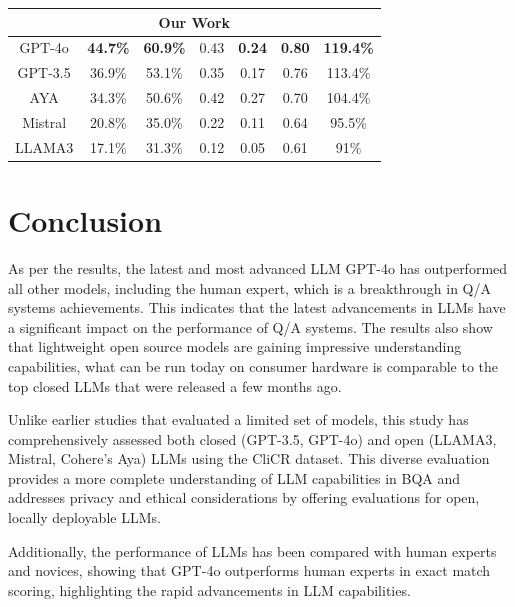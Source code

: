 \documentclass[onecolumn, conference]{IEEEtran}
\begin{document}
\begin{table}
\begin{tabular}{|c|c|c|c|c|c|c|}
    \multicolumn{7}{|c|}{Our Work}                                                                                              \\ \hline
    GPT-4o          & \textbf{44.7\%} & \textbf{60.9\%} & 0.43            & \textbf{0.24}   & \textbf{0.80}  & \textbf{119.4\%} \\ \hline
    GPT-3.5         & 36.9\%          & 53.1\%          & 0.35            & 0.17            & 0.76           & 113.4\%          \\ \hline
    AYA             & 34.3\%          & 50.6\%          & 0.42            & 0.27            & 0.70           & 104.4\%          \\ \hline
    Mistral         & 20.8\%          & 35.0\%          & 0.22            & 0.11            & 0.64           & 95.5\%           \\ \hline
    LLAMA3          & 17.1\%          & 31.3\%          & 0.12            & 0.05            & 0.61           & 91\%             \\ \hline
  \end{tabular}
  \label{tab:evaluation}
\end{table}

\section{Conclusion}

As per the results, the latest and most advanced LLM GPT-4o has outperformed all other models, including the human expert, which is a breakthrough in Q/A systems achievements. This indicates that the latest advancements in LLMs have a significant impact on the performance of Q/A systems. The results also show that lightweight open source models are gaining impressive understanding capabilities, what can be run today on consumer hardware is comparable to the top closed LLMs that were released a few months ago.

Unlike earlier studies that evaluated a limited set of models, this study has comprehensively assessed both closed (GPT-3.5, GPT-4o) and open (LLAMA3, Mistral, Cohere's Aya) LLMs using the CliCR dataset. This diverse evaluation provides a more complete understanding of LLM capabilities in BQA and addresses privacy and ethical considerations by offering evaluations for open, locally deployable LLMs.

Additionally, the performance of LLMs has been compared with human experts and novices, showing that GPT-4o outperforms human experts in exact match scoring, highlighting the rapid advancements in LLM capabilities.
\end{document}
